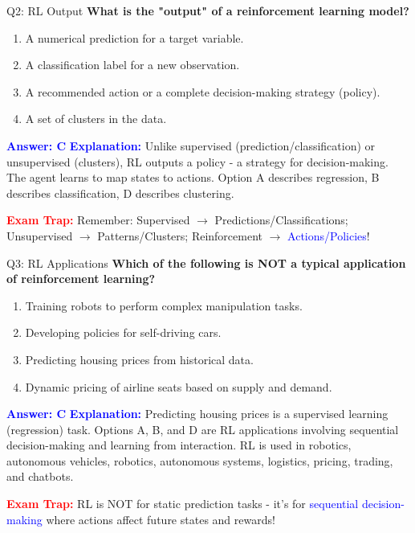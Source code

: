 \documentclass[8pt]{beamer}
\begin{document}
	\begin{frame}{Q2: RL Output}
		\fontsize{6.5}{7.5}\selectfont
		\textbf{What is the "output" of a reinforcement learning model?}
		
		\begin{enumerate}
			\item A numerical prediction for a target variable.
			\item A classification label for a new observation.
			\item A recommended action or a complete decision-making strategy (policy).
			\item A set of clusters in the data.
		\end{enumerate}
		
		\vspace{0.1cm}
		\textcolor{blue}{\textbf{Answer: C}}
		\vspace{0.1cm}
		\textcolor{blue}{\textbf{Explanation:}} Unlike supervised (prediction/classification) or unsupervised (clusters), RL outputs a policy - a strategy for decision-making. The agent learns to map states to actions. Option A describes regression, B describes classification, D describes clustering.
		
		\textcolor{red}{\textbf{Exam Trap:}} Remember: Supervised $\rightarrow$ Predictions/Classifications; Unsupervised $\rightarrow$ Patterns/Clusters; Reinforcement $\rightarrow$ \textcolor{blue}{Actions/Policies}!
	\end{frame}
	
	\begin{frame}{Q3: RL Applications}
		\fontsize{6.5}{7.5}\selectfont
		\textbf{Which of the following is NOT a typical application of reinforcement learning?}
		
		\begin{enumerate}
			\item Training robots to perform complex manipulation tasks.
			\item Developing policies for self-driving cars.
			\item Predicting housing prices from historical data.
			\item Dynamic pricing of airline seats based on supply and demand.
		\end{enumerate}
		
		\vspace{0.1cm}
		\textcolor{blue}{\textbf{Answer: C}}
		\vspace{0.1cm}
		\textcolor{blue}{\textbf{Explanation:}} Predicting housing prices is a supervised learning (regression) task. Options A, B, and D are RL applications involving sequential decision-making and learning from interaction. RL is used in robotics, autonomous vehicles, robotics, autonomous systems, logistics, pricing, trading, and chatbots.
		
		\textcolor{red}{\textbf{Exam Trap:}} RL is NOT for static prediction tasks - it's for \textcolor{blue}{sequential decision-making} where actions affect future states and rewards!
	\end{frame}
	
\end{document}
